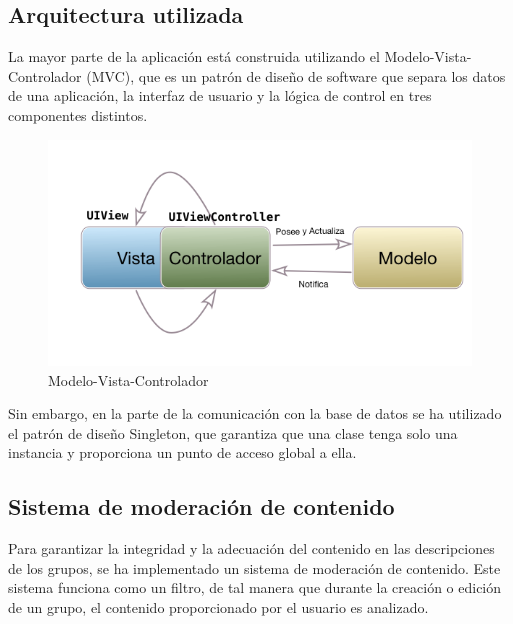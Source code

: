 \subsection{Arquitectura utilizada}
La mayor parte de la aplicación está construida utilizando el Modelo-Vista-Controlador (MVC), 
que es un patrón de diseño de software que separa los datos de una aplicación, la interfaz de usuario y 
la lógica de control en tres componentes distintos. 
\begin{figure}[H]
        \centering
        \includegraphics[width=0.66\linewidth]{images/realidad_mvc.png}
        \caption{Modelo-Vista-Controlador}
        \label{fig:MVC}
\end{figure}
Sin embargo, en la parte de la comunicación con la base de datos se ha utilizado el patrón de diseño Singleton, 
que garantiza que una clase tenga solo una instancia y proporciona un punto de acceso global a ella.

\subsection{Sistema de moderación de contenido}
Para garantizar la integridad y la adecuación del contenido en las descripciones de los grupos, se ha implementado un sistema de moderación de contenido. Este sistema funciona como un filtro, de tal manera que durante la creación o edición de un grupo, el contenido proporcionado por el usuario es analizado. 


